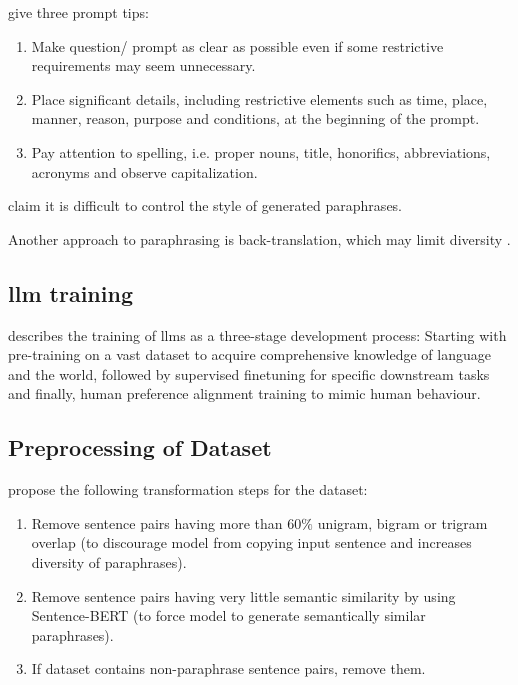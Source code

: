 \citet{fu_learning_2024} give three prompt tips:
\begin{enumerate}
    \item Make question/ prompt as clear as possible even if some restrictive requirements may seem unnecessary.
    \item Place significant details, including restrictive elements such as time, place, manner, reason, purpose and conditions, at the beginning of the prompt.
    \item Pay attention to spelling, i.e. proper nouns, title, honorifics, abbreviations, acronyms and observe capitalization.
\end{enumerate}

\citet{zhou_paraphrase_2021} claim it is difficult to control the style of generated paraphrases.

Another approach to paraphrasing is back-translation, which may limit diversity \cite{zhou_paraphrase_2025}.


\subsection{\ac{llm} training}

\citet{master_thesis_paraphrasing_2024} describes the training of \acp{llm} as a three-stage development process:
Starting with pre-training on a vast dataset to acquire comprehensive knowledge of language and the world, 
followed by supervised finetuning for specific downstream tasks and finally,
human preference alignment training to mimic human behaviour.

\subsection{Preprocessing of Dataset}

\citet{palivela_optimization_2021} propose the following transformation steps for the dataset:
\begin{enumerate}
    \item Remove sentence pairs having more than 60$\%$ unigram, bigram or trigram overlap 
    (to discourage model from copying input sentence and increases diversity of paraphrases).
    \item Remove sentence pairs having very little semantic similarity by using Sentence-BERT 
    (to force model to generate semantically similar paraphrases).
    \item If dataset contains non-paraphrase sentence pairs, remove them.   
\end{enumerate}

